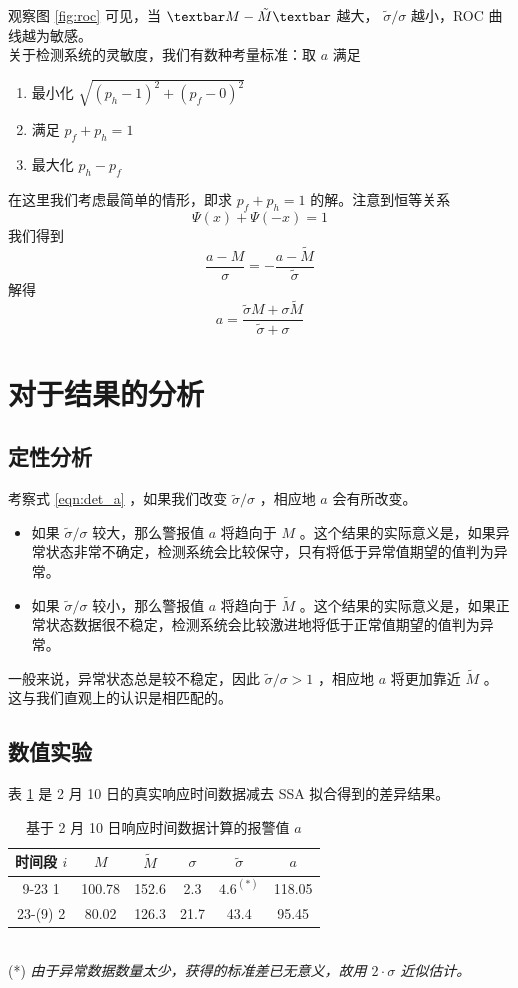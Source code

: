 \documentclass[a4paper]{article}
\begin{document}
观察图 \ref{fig:roc} 可见，当 $\textbar M - \tilde{M} \textbar $ 越大， $ \tilde{\sigma} / \sigma $ 越小，ROC 曲线越为敏感。
\\
关于检测系统的灵敏度，我们有数种考量标准：取 $a$ 满足
\begin{enumerate}
	\item 最小化 $\sqrt{(p_h - 1)^2 + (p_f - 0)^2}$
	\item 满足 $p_f + p_h = 1$
	\item 最大化 $p_h - p_f$
\end{enumerate}
在这里我们考虑最简单的情形，即求 $p_f + p_h = 1$ 的解。注意到恒等关系 $$\Psi(x) + \Psi(-x) = 1$$ 我们得到
\begin{equation}
	\label{eqn:det_a_formula}
	\frac{a-M}{\sigma} = -\frac{a-\tilde{M}}{\tilde{\sigma}}
\end{equation}
解得
\begin{equation}
	\label{eqn:det_a}
	a = \frac{\tilde{\sigma}M + \sigma \tilde{M}}{\tilde{\sigma} + \sigma}
\end{equation}

\section{对于结果的分析}
\subsection{定性分析}
考察式 \ref{eqn:det_a} ，如果我们改变 $\tilde{\sigma}/\sigma$ ，相应地 $a$ 会有所改变。
\begin{itemize}
\item 如果 $\tilde{\sigma}/\sigma$ 较大，那么警报值 $a$ 将趋向于 $M$ 。这个结果的实际意义是，如果异常状态非常不确定，检测系统会比较保守，只有将低于异常值期望的值判为异常。
\item 如果 $\tilde{\sigma}/\sigma$ 较小，那么警报值 $a$ 将趋向于 $\tilde{M}$ 。这个结果的实际意义是，如果正常状态数据很不稳定，检测系统会比较激进地将低于正常值期望的值判为异常。
\end{itemize}
一般来说，异常状态总是较不稳定，因此 $\tilde{\sigma}/\sigma > 1$ ，相应地 $a$ 将更加靠近 $\tilde{M}$ 。
这与我们直观上的认识是相匹配的。
\subsection{数值实验}
表 \ref{tab:test_roc} 是 2 月 10 日的真实响应时间数据减去 SSA 拟合得到的差异结果。
\begin{table}[htbp]
	\centering
	\caption{基于 2 月 10 日响应时间数据计算的报警值 $a$}
	\label{tab:test_roc}
\begin{tabular}{c|cccc|c}
\hline
时间段 $i$  & $M$   & $\tilde{M}$ & $\sigma$ & $\tilde{\sigma}$ & $a$    \\
\hline
9-23 1   & 100.78 & 152.6        & 2.3     & $4.6^{(*)} $     & 118.05 \\
23-(9) 2 & 80.02 & 126.3        & 21.7    & 43.4             & 95.45 \\
\hline
\end{tabular}
\end{table}\\
(*) \emph{由于异常数据数量太少，获得的标准差已无意义，故用 $2 \cdot \sigma$ 近似估计。}
\end{document}
